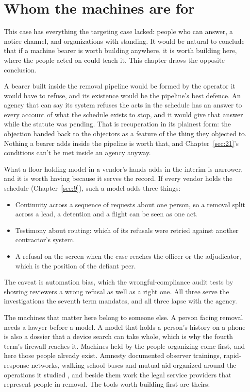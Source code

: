 \section{Whom the machines are for}
\label{sec:8.8}
This case has everything the targeting case lacked: people who can answer, a notice channel, and organizations with standing. It would be natural to conclude that if a machine bearer is worth building anywhere, it is worth building here, where the people acted on could teach it. This chapter draws the opposite conclusion.

A bearer built inside the removal pipeline would be formed by the operator it would have to refuse, and its existence would be the pipeline's best defence. An agency that can say its system refuses the acts in the schedule has an answer to every account of what the schedule exists to stop, and it would give that answer while the statute was pending. That is recuperation in its plainest form: the objection handed back to the objectors as a feature of the thing they objected to. Nothing a bearer adds inside the pipeline is worth that, and Chapter~\ref{sec:21}'s conditions can't be met inside an agency anyway.

What a floor-holding model in a vendor's hands adds in the interim is narrower, and it is worth having because it serves the record. If every vendor holds the schedule (Chapter~\ref{sec:9}), such a model adds three things:

\begin{itemize}
\item Continuity across a sequence of requests about one person, so a removal split across a lead, a detention and a flight can be seen as one act.
\item Testimony about routing: which of its refusals were retried against another contractor's system.
\item A refusal on the screen when the case reaches the officer or the adjudicator, which is the position of the defiant peer.
\end{itemize}

The caveat is automation bias, which the wrongful-compliance audit tests by showing reviewers a wrong refusal as well as a right one. All three serve the investigations the seventh term mandates, and all three lapse with the agency.

The machines that matter here belong to someone else. A person facing removal needs a lawyer before a model. A model that holds a person's history on a phone is also a dossier that a device search can take whole, which is why the fourth term's firewall reaches it. Machines held by the people organizing come first, and here those people already exist. Amnesty documented observer trainings, rapid-response networks, walking school buses and mutual aid organized around the operations it studied \autocite{Amnesty2026Whistles}, and beside them work the legal service providers that represent people in removal. The tools worth building first are theirs:

